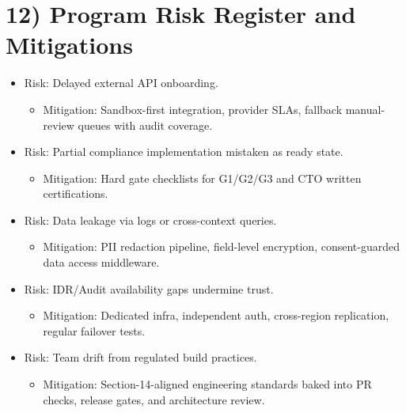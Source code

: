 ﻿\documentclass[12pt]{article}
\begin{document}
\section{12) Program Risk Register and Mitigations}


\begin{itemize}
\item Risk: Delayed external API onboarding.
\begin{itemize}
\item Mitigation: Sandbox-first integration, provider SLAs, fallback manual-review queues with audit coverage.
\end{itemize}
\end{itemize}

\begin{itemize}
\item Risk: Partial compliance implementation mistaken as ready state.
\begin{itemize}
\item Mitigation: Hard gate checklists for G1/G2/G3 and CTO written certifications.
\end{itemize}
\end{itemize}

\begin{itemize}
\item Risk: Data leakage via logs or cross-context queries.
\begin{itemize}
\item Mitigation: PII redaction pipeline, field-level encryption, consent-guarded data access middleware.
\end{itemize}
\end{itemize}

\begin{itemize}
\item Risk: IDR/Audit availability gaps undermine trust.
\begin{itemize}
\item Mitigation: Dedicated infra, independent auth, cross-region replication, regular failover tests.
\end{itemize}
\end{itemize}

\begin{itemize}
\item Risk: Team drift from regulated build practices.
\begin{itemize}
\item Mitigation: Section-14-aligned engineering standards baked into PR checks, release gates, and architecture review.
\end{itemize}
\end{itemize}
\end{document}
